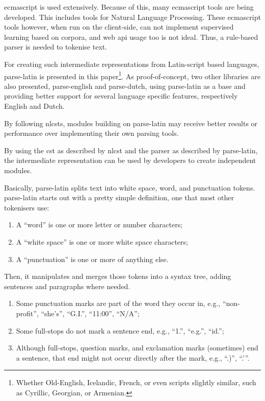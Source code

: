 \gls{ecmascript} is used extensively. Because of this, many \gls{ecmascript}
tools are being developed. This includes tools for Natural Language
Processing. These \gls{ecmascript} tools however, when run on the client-side,
can not implement supervised learning based on corpora, and web
\gls{api} usage too is not ideal. Thus, a rule-based parser is needed to
tokenise text.

For creating such intermediate representations from Latin-script based
languages, parse-latin is presented in this paper\footnote{Whether
  Old-English, Icelandic, French, or even scripts slightly similar, such
  as Cyrillic, Georgian, or Armenian.}. As proof-of-concept, two other
libraries are also presented, parse-english and parse-dutch, using
parse-latin as a base and providing better support for several language
specific features, respectively English and Dutch.

By following \glspl{nlcst}, modules building on parse-latin may receive
better results or performance over implementing their own parsing tools.

By using the \gls{cst} as described by \gls{nlcst} and the parser as
described by parse-latin, the intermediate representation can be used by
developers to create independent modules.

Basically, parse-latin splits text into white space, word, and
punctuation tokens. parse-latin starts out with a pretty simple
definition, one that most other tokenisers use:

\begin{enumerate}
\item
  A ``word'' is one or more letter or number characters;
\item
  A ``white space'' is one or more white space characters;
\item
  A ``punctuation'' is one or more of anything else.
\end{enumerate}

Then, it manipulates and merges those tokens into a syntax tree, adding
sentences and paragraphs where needed.

\begin{enumerate}
\item
  Some punctuation marks are part of the word they occur in, e.g.,
  ``non-profit'', ``she's'', ``G.I.'', ``11:00'', ``N\slash A'';
\item
  Some full-stops do not mark a sentence end, e.g., ``1.'', ``e.g.'',
  ``id.'';
\item
  Although full-stops, question marks, and exclamation marks (sometimes)
  end a sentence, that end might not occur directly after the mark,
  e.g., ``.)'', ``.'{}''.
\end{enumerate}

